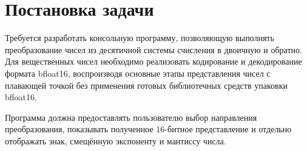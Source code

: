 \section{Постановка задачи}

Требуется разработать консольную программу, позволяющую выполнять преобразование
чисел из десятичной системы счисления в двоичную и обратно. Для вещественных чисел
необходимо реализовать кодирование и декодирование формата bfloat16, воспроизводя
основные этапы представления чисел с плавающей точкой без применения готовых
библиотечных средств упаковки bfloat16.

Программа должна предоставлять пользователю выбор направления преобразования,
показывать полученное 16-битное представление и отдельно отображать знак,
смещённую экспоненту и мантиссу числа.

\newpage
